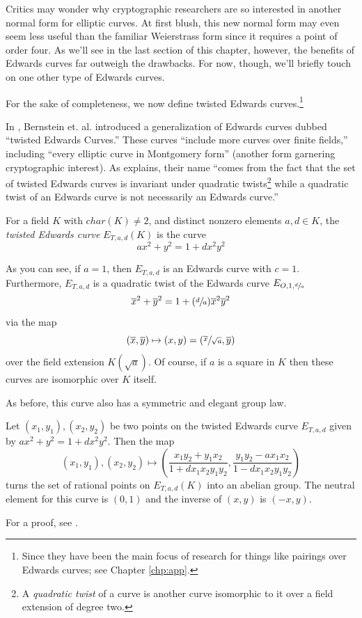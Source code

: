Critics may wonder why cryptographic researchers are so interested in another
    normal form for elliptic curves.
At first blush, this new normal form may even seem less useful than the
    familiar Weierstrass form since it requires a point of order four.
As we'll see in the last section of this chapter, however, the benefits of
    Edwards curves far outweigh the drawbacks.
For now, though, we'll briefly touch on one other type of Edwards curves.


For the sake of completeness, we now define twisted Edwards
    curves.\footnote{Since they have been the main focus of research for things
    like pairings over Edwards curves; see Chapter \ref{chp:app}.}

In \cite{bernstein2008twisted}, Bernstein et. al. introduced a generalization
    of Edwards curves dubbed ``twisted Edwards Curves.''
These curves ``include more curves over finite fields,'' including ``every
    elliptic curve in Montgomery form'' (another form garnering cryptographic
    interest).
As \cite{arene2011faster} explains, their name ``comes from the fact that the
    set of twisted Edwards curves is invariant under quadratic
    twists\footnote{A \textit{quadratic twist} of a curve is another curve
    isomorphic to it over a field extension of degree two.} while a quadratic
    twist of an Edwards curve is not necessarily an Edwards curve.''

\begin{dfn}
For a field $K$ with $char(K) \ne 2$, and distinct nonzero elements $a, d \in
    K$, the \textit{twisted Edwards curve} $E_{T, a, d}(K)$ is the curve
\[
ax^2 + y^2 = 1 + dx^2y^2
\]
\end{dfn}

As you can see, if $a = 1$, then $E_{T, a, d}$ is an Edwards curve with $c =
    1$.
Furthermore, $E_{T, a, d}$ is a quadratic twist of the Edwards curve $E_{O, 1,
    \sfrac{d}{a}}$
\[
\overline{x}^2 + \overline{y}^2
    =   1 + (\sfrac{d}{a})\overline{x}^2\overline{y}^2
\]
    via the map
\[
(\overline{x}, \overline{y}) \mapsto (x, y)
    =   (\sfrac{\overline{x}}{\sqrt{a}}, \overline{y})
\]
    over the field extension $K(\sqrt{a})$.
Of course, if $a$ is a square in $K$ then these curves are isomorphic over $K$
    itself.

As before, this curve also has a symmetric and elegant group law.
\begin{thm}
Let $(x_1, y_1), (x_2, y_2)$ be two points on the twisted Edwards curve
    $E_{T, a, d}$ given by $ax^2 + y^2 = 1 + dx^2y^2$.
Then the map
\[
(x_1, y_1), (x_2, y_2) \mapsto
\left(
    \frac{x_1y_2 + y_1x_2}{1 + dx_1x_2y_1y_2}
    ,
    \frac{y_1y_2 - ax_1x_2}{1 - dx_1x_2y_1y_2}
\right)
\]
    turns the set of rational points on $E_{T, a, d}(K)$ into an abelian group.
The neutral element for this curve is $(0, 1)$ and the inverse of $(x, y)$ is
    $(-x, y)$.
\end{thm}
For a proof, see \cite{bernstein2008twisted}.

